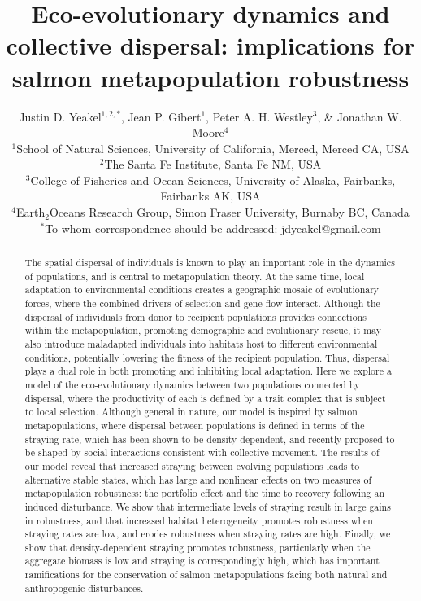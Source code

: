 \documentclass{revtex4}
\begin{document}
\title{Eco-evolutionary dynamics and collective dispersal: implications for salmon metapopulation robustness}
\author{
Justin D. Yeakel${}^{1,2,*}$, Jean P. Gibert${}^{1}$, Peter A. H. Westley${}^{3}$, \& Jonathan W. Moore${}^{4}$ \\
${}^1$School of Natural Sciences, University of California, Merced, Merced CA, USA \\
${}^2$The Santa Fe Institute, Santa Fe NM, USA \\
${}^3$College of Fisheries and Ocean Sciences, University of Alaska, Fairbanks, Fairbanks AK, USA \\
${}^4$Earth${}_2$Oceans Research Group, Simon Fraser University, Burnaby BC, Canada \\
${}^*$To whom correspondence should be addressed: jdyeakel@gmail.com
}




\begin{abstract} %
The spatial dispersal of individuals is known to play an important role in the dynamics of populations, and is central to metapopulation theory. At the same time, local adaptation to environmental conditions creates a geographic mosaic of evolutionary forces, where the combined drivers of selection and gene flow interact. Although the dispersal of individuals from donor to recipient populations provides connections within the metapopulation, promoting demographic and evolutionary rescue, it may also introduce maladapted individuals into habitats host to different environmental conditions, potentially lowering the fitness of the recipient population. Thus, dispersal plays a dual role in both promoting and inhibiting local adaptation. Here we explore a model of the eco-evolutionary dynamics between two populations connected by dispersal, where the productivity of each is defined by a trait complex that is subject to local selection. Although general in nature, our model is inspired by salmon metapopulations, where dispersal between populations is defined in terms of the straying rate, which has been shown to be density-dependent, and recently proposed to be shaped by social interactions consistent with collective movement. The results of our model reveal that increased straying between evolving populations leads to alternative stable states, which has large and nonlinear effects on two measures of metapopulation robustness: the portfolio effect and the time to recovery following an induced disturbance. We show that intermediate levels of straying result in large gains in robustness, and that increased habitat heterogeneity promotes robustness when straying rates are low, and erodes robustness when straying rates are high. Finally, we show that density-dependent straying promotes robustness, particularly when the aggregate biomass is low and straying is correspondingly high, which has important ramifications for the conservation of salmon metapopulations facing both natural and anthropogenic disturbances.
\end{abstract} 
\end{document}
